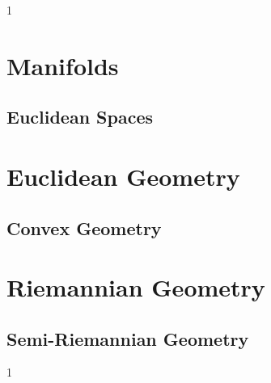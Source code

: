 \documentclass{book}                                                           %
\def\compilegeometry{0}
\def\compilegeotop{0}
\begin{document}
    \if\compilegeometry1
            \label{book:Geometry}%
            \renewcommand{\PATH}{\TOPPATH/Geometry}
            \setcounter{page}{\value{endpage}}
            \part{Manifolds}
                \renewcommand{\PARPATH}{\TOPPATH/Geometry/Manifolds}
                \chapter{Euclidean Spaces}
                    \renewcommand{\PATH}{\PARPATH/Euclidean_Spaces}
                    \label{chapt:Euclidean_Spaces}%
                    
            \part{Euclidean Geometry}
                \renewcommand{\PARPATH}{\TOPPATH/Geometry/Euclidean_Geometry}
                \chapter{Convex Geometry}
                    \renewcommand{\PATH}{\PARPATH/Convex_Geometry}
                    \label{chapt:Euclidean_Spaces}%
                    
            \part{Riemannian Geometry}
                \renewcommand{\PARPATH}{\TOPPATH/Geometry/Riemannian_Geometry}
                \chapter{Semi-Riemannian Geometry}
                    \renewcommand{\PATH}{\PARPATH/Semi_Riemannian_Geometry}
                    \label{chapt:Semi_Riemannian}%
                    
        \clearpage
        \setcounter{endpage}{\thepage}
    \fi

    \if\compilegeotop1
            \label{book:Geometric_Topology}%
            \renewcommand{\PATH}{\TOPPATH/Geometric_Topology}
            \setcounter{page}{\value{endpage}}
\end{document}
